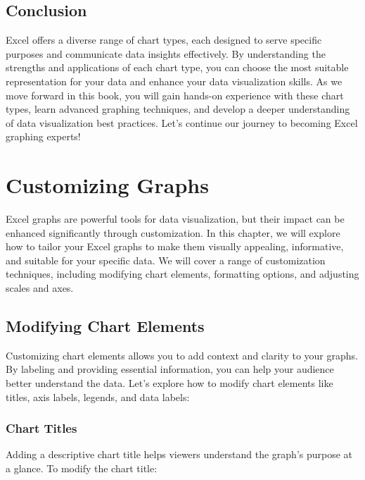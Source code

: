 \documentclass[
]{book}
\begin{document}
\hypertarget{conclusion-1}{%
\section{Conclusion}\label{conclusion-1}}

Excel offers a diverse range of chart types, each designed to serve specific purposes and communicate data insights effectively. By understanding the strengths and applications of each chart type, you can choose the most suitable representation for your data and enhance your data visualization skills. As we move forward in this book, you will gain hands-on experience with these chart types, learn advanced graphing techniques, and develop a deeper understanding of data visualization best practices. Let's continue our journey to becoming Excel graphing experts!

\hypertarget{customizing-graphs}{%
\chapter{Customizing Graphs}\label{customizing-graphs}}

Excel graphs are powerful tools for data visualization, but their impact can be enhanced significantly through customization. In this chapter, we will explore how to tailor your Excel graphs to make them visually appealing, informative, and suitable for your specific data. We will cover a range of customization techniques, including modifying chart elements, formatting options, and adjusting scales and axes.

\hypertarget{modifying-chart-elements}{%
\section{Modifying Chart Elements}\label{modifying-chart-elements}}

Customizing chart elements allows you to add context and clarity to your graphs. By labeling and providing essential information, you can help your audience better understand the data. Let's explore how to modify chart elements like titles, axis labels, legends, and data labels:

\hypertarget{chart-titles}{%
\subsection{Chart Titles}\label{chart-titles}}

Adding a descriptive chart title helps viewers understand the graph's purpose at a glance. To modify the chart title:
\end{document}
